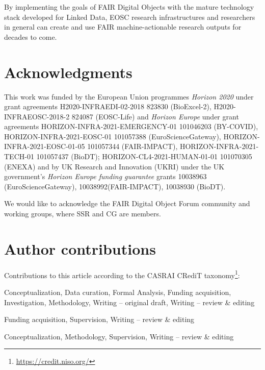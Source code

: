 \documentclass[fleqn,10pt,lineno]{wlpeerjlua}
\providecommand{\tightlist}{%
  \setlength{\itemsep}{0pt}\setlength{\parskip}{0pt}}
\begin{document}
By implementing the goals of FAIR Digital Objects with the mature technology stack developed for Linked Data, EOSC research infrastructures and researchers in general can create and use FAIR machine-actionable research outputs for decades to come.

\section*{Acknowledgments}

\begin{small}
This work was funded by the European Union programmes \emph{Horizon 2020} under grant agreements H2020-INFRAEDI-02-2018 823830 (BioExcel-2), H2020-INFRAEOSC-2018-2 824087 (EOSC-Life) and \emph{Horizon Europe} under grant agreements HORIZON-INFRA-2021-EMERGENCY-01 101046203 (BY-COVID), HORIZON-INFRA-2021-EOSC-01 101057388 (EuroScienceGateway), HORIZON-INFRA-2021-EOSC-01-05 101057344 (FAIR-IMPACT), HORIZON-INFRA-2021-TECH-01 101057437 (BioDT);  HORIZON-CL4-2021-HUMAN-01-01 101070305 (ENEXA)  and by UK Research and Innovation (UKRI) under the UK government’s \emph{Horizon Europe funding guarantee} grants 10038963 (EuroScienceGateway), 10038992(FAIR-IMPACT), 10038930 (BioDT).
\end{small}

We would like to acknowledge the FAIR Digital Object Forum \autocite{FAIRDigitalObjects} community and working groups, where SSR and CG are members. 

\section*{Author contributions}
\begin{small}

Contributions to this article according to the CASRAI CRediT taxonomy\footnote{\url{https://credit.niso.org/}}:

\begin{description}
\tightlist
\item[Stian Soiland-Reyes]
Conceptualization, Data curation, Formal Analysis, Funding acquisition, Investigation, Methodology,
Writing -- original draft, Writing -- review \& editing
\item[Carole Goble]
Funding acquisition, Supervision, Writing -- review \& editing
\item[Paul Groth]
Conceptualization, Methodology, Supervision, Writing -- review \& editing
\end{description}
\end{small}


%
\def\UrlFont{\small}

\printbibliography

\clearpage
{}
\printshorthands[heading=fdobibliography]


\end{document}
